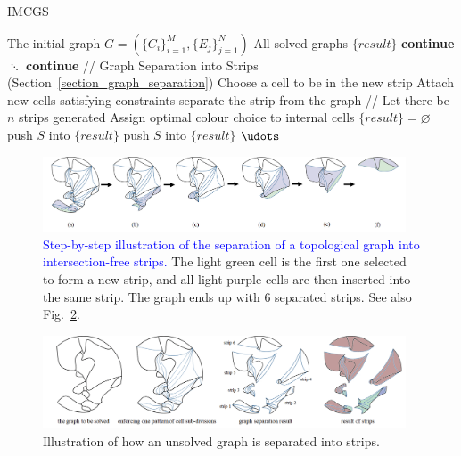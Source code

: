 \documentclass[journal]{IEEEtran}
\begin{document}
\begin{algorithm}[t]
    \caption{IMCGS}\label{alg:1}
    \begin{algorithmic}[1]
        \Require The initial graph $G = (\{C_i\}_{i = 1}^M, \{E_j\}_{j = 1}^N)$  
        \Ensure All solved graphs $\{result\}$  
\State \textbf{continue}
\EndIf
\State $\ddots$
	\State \textbf{continue}
	\EndIf
	\State // Graph Separation into Strips (Section~\ref{section_graph_separation})
		\label{alg:separation_start}
		\State Choose a cell to be in the new strip
		\State Attach new cells satisfying constraints
		\State separate the strip from the graph
		\EndWhile\label{alg:separation_end}
		\State // Let there be $n$ strips generated
		\State Assign optimal colour choice to internal cells\label{alg:combining_start}
		\State $\{result\} = \varnothing$
		\State push $S$ into $\{result\}$
		\Else
			\State push $S$ into $\{result\}$
		\EndIf
		\EndIf\label{alg:combining_end}
		\EndFor
	\EndFor
\State $\udots$
\EndFor%
    \end{algorithmic}  
\end{algorithm}


\begin{figure}[t]
\centering
\includegraphics[width=0.96\textwidth]{figures/steps_2}
\caption{\textcolor{blue}{
Step-by-step illustration of the separation of a topological graph into intersection-free strips.}
The light green cell is the first one selected to form a new strip, and all light purple cells are then inserted into the same strip. The graph ends up with $6$ separated strips. See also Fig.~\ref{fig:complicated_graph}.}
\label{fig:steps}
\end{figure}

\begin{figure}[t]
\centering
\includegraphics[width =0.96\textwidth]{figures/graph_separation_3}
\caption{Illustration of how an unsolved graph is separated into strips. }\label{fig:complicated_graph}
\end{figure}
\end{document}
